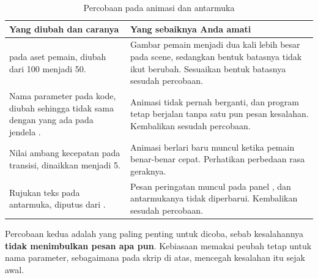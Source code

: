 \begin{table}[htbp]
\centering
\caption{Percobaan pada animasi dan antarmuka}
\label{tab:percobaan-ch14}
{\setlength{\tabcolsep}{4pt}\footnotesize%
\begin{tabularx}{\textwidth}{@{}L{5.4cm} Y@{}}
\toprule
\headrow \textbf{Yang diubah dan caranya} & \textbf{Yang sebaiknya Anda amati} \\
\midrule
{} pada aset pemain, diubah dari 100 menjadi 50. &
Gambar pemain menjadi dua kali lebih besar pada scene, sedangkan bentuk
batasnya tidak ikut berubah. Sesuaikan bentuk batasnya sesudah percobaan. \\
\addlinespace
Nama parameter pada kode, diubah sehingga tidak sama dengan yang ada pada
jendela . &
Animasi tidak pernah berganti, dan program tetap berjalan tanpa satu pun pesan
kesalahan. Kembalikan sesudah percobaan. \\
\addlinespace
Nilai ambang kecepatan pada transisi, dinaikkan menjadi 5. &
Animasi berlari baru muncul ketika pemain benar-benar cepat. Perhatikan
perbedaan rasa geraknya. \\
\addlinespace
Rujukan teks pada antarmuka, diputus dari . &
Pesan peringatan muncul pada panel , dan antarmukanya tidak
diperbarui. Kembalikan sesudah percobaan. \\
\bottomrule
\end{tabularx}}
\end{table}

\begin{catatabox}
Percobaan kedua adalah yang paling penting untuk dicoba, sebab kesalahannya
\textbf{tidak menimbulkan pesan apa pun}. Kebiasaan memakai peubah tetap untuk
nama parameter, sebagaimana pada skrip di atas, mencegah kesalahan itu sejak
awal.
\end{catatabox}

